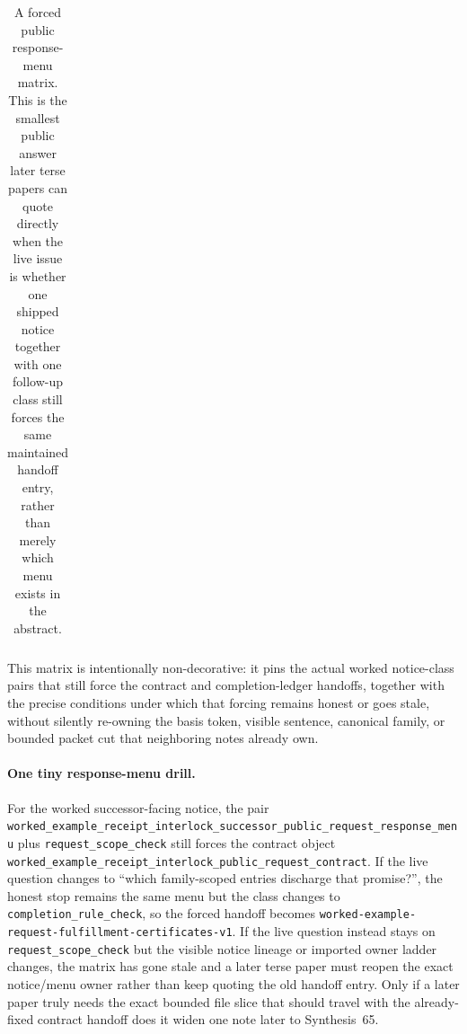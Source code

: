\documentclass[11pt]{article}
\begin{document}
\begin{table}[t]
\begin{tabularx}{\linewidth}{@{}lX@{}}
\bottomrule
\end{tabularx}
\caption{A forced public response-menu matrix. This is the smallest public answer later terse papers can quote directly when the live issue is whether one shipped notice together with one follow-up class still forces the same maintained handoff entry, rather than merely which menu exists in the abstract.}
\label{tab:forced-public-response-menu-matrix}
\end{table}

This matrix is intentionally non-decorative: it pins the actual worked notice-class pairs that still force the contract and completion-ledger handoffs, together with the precise conditions under which that forcing remains honest or goes stale, without silently re-owning the basis token, visible sentence, canonical family, or bounded packet cut that neighboring notes already own.\cite{series:workedexample}

\paragraph{One tiny response-menu drill.}
For the worked successor-facing notice, the pair \nolinkurl{worked_example_receipt_interlock_successor_public_request_response_menu} plus \nolinkurl{request_scope_check} still forces the contract object \nolinkurl{worked_example_receipt_interlock_public_request_contract}. If the live question changes to ``which family-scoped entries discharge that promise?'', the honest stop remains the same menu but the class changes to \nolinkurl{completion_rule_check}, so the forced handoff becomes \nolinkurl{worked-example-request-fulfillment-certificates-v1}. If the live question instead stays on \nolinkurl{request_scope_check} but the visible notice lineage or imported owner ladder changes, the matrix has gone stale and a later terse paper must reopen the exact notice/menu owner rather than keep quoting the old handoff entry. Only if a later paper truly needs the exact bounded file slice that should travel with the already-fixed contract handoff does it widen one note later to Synthesis~65.\cite{series:workedexample}
\end{document}
